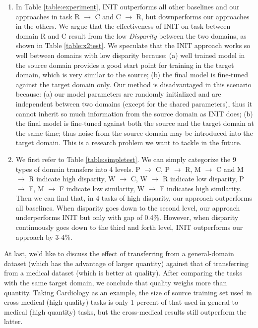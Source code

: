 \begin{enumerate}
\item In Table \ref{table:experiment}, INIT outperforms all other baselines and our approaches in task R $\rightarrow$ C and C $\rightarrow$ R, but downperforms our approaches in the others. We argue that the effectiveness of INIT on task between domain R and C result from the low \textit{Disparity} between the two domains, as shown in Table \ref{table:x2test}.
We speculate that the INIT approach works so well between domains with low disparity because: (a) well trained model in the source domain provides a good start point for training in the target domain, which is very similar to the source; (b) the final model is fine-tuned against the target domain only. Our method is disadvantaged in this scenario because: (a) our model parameters are randomly initialized and are independent between two domains (except for the shared parameters), thus it cannot inherit so much information from the source domain as INIT does; (b) the final model is fine-tuned against both the source and the target domain at the same time; thus noise from the source domain may be introduced into the target domain. This is a research problem we want to tackle in the future.
\item We first refer to Table \ref{table:simpletest}. We can simply categorize 
the 9 types of domain transfers into 4 levels. P $\rightarrow$ C, P $\rightarrow$ R, M $\rightarrow$ C and M $\rightarrow$ R indicate high disparity, W $\rightarrow$ C, W $\rightarrow$ R indicate low disparity, P $\rightarrow$ F, M $\rightarrow$ F indicate low similarity, W $\rightarrow$ F indicates high similarity. Then we can find that, in 4 tasks of high disparity, our approach outperforms all baselines. When disparity goes down to the second level, our approach underperforms INIT but only with gap of 0.4\%. However, when disparity continuously goes down to the third and forth level, INIT outperforms our approach by 3-4\%.
\end{enumerate}

At last, we'd like to discuss the effect of transferring from a general-domain dataset (which has the advantage of larger quantity) against that of 
transferring from a medical dataset (which is better at quality). 
After comparing the tasks with the same target domain, we conclude
that quality weighs more than quantity. Taking Cardiology as an example, 
the size of source training set used in cross-medical (high quality) tasks is 
only 1 percent of that used in general-to-medical (high quantity) 
tasks, but the cross-medical results still outperform the latter.

